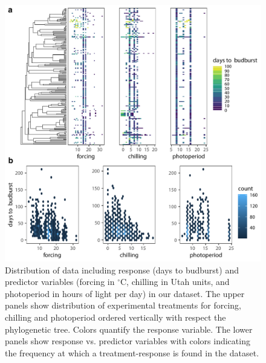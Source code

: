 \documentclass[11pt]{article}
\begin{document}
\begin{figure}
  \begin{center}
  \includegraphics[width=16cm]{../../analyses/phylogeny/figures/rawplots_2Ds.pdf} 
  \caption{Distribution of data including response (days to budburst) and predictor variables (forcing in $^\circ$C, chilling in Utah units, and photoperiod in hours of light per day) in our dataset. The upper panels show distribution of experimental treatments for forcing, chilling and photoperiod ordered vertically with respect the phylogenetic tree. Colors quantify the response variable. The lower panels show response vs. predictor variables with colors indicating the frequency at which a treatment-response is found in the dataset.}
  \label{fig:raw2ddata}
  \end{center}
\end{figure}
\clearpage
\end{document}
